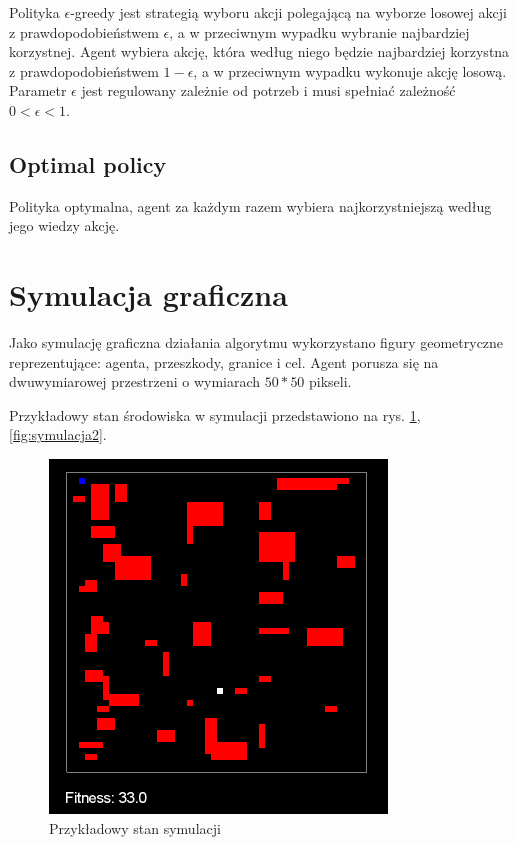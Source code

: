 Polityka $\epsilon$-greedy jest strategią wyboru akcji polegającą na wyborze losowej akcji z prawdopodobieństwem $\epsilon$, a w przeciwnym wypadku wybranie najbardziej korzystnej. Agent wybiera akcję, która według niego będzie najbardziej korzystna z prawdopodobieństwem $1-\epsilon$, a w przeciwnym wypadku wykonuje akcję losową. Parametr $\epsilon$ jest regulowany zależnie od potrzeb i musi spełniać zależność $0 < \epsilon < 1$.

\subsection{Optimal policy}

Polityka optymalna, agent za każdym razem wybiera najkorzystniejszą według jego wiedzy akcję.

\section{Symulacja graficzna}
\label{sec:symulacjagraficzna}

Jako symulację graficzna działania algorytmu wykorzystano figury geometryczne reprezentujące: agenta, przeszkody, 
granice i cel.
Agent porusza się na dwuwymiarowej przestrzeni o wymiarach $50*50$ pikseli.

Przykładowy stan środowiska w symulacji przedstawiono na rys. \ref{fig:symulacja}, \ref{fig:symulacja2}.

\begin{figure}[H]
    \centering
    \includegraphics[scale=0.6]{symulacja}
    \caption{Przykładowy stan symulacji}
    \label{fig:symulacja}
\end{figure}

